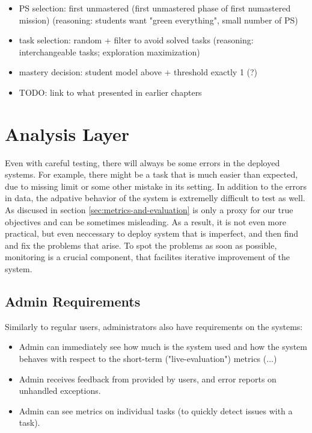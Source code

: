 \begin{itemize}
\item PS selection: first unmastered
  (first unmastered phase of first numastered mission)
  (reasoning: students want "green everything", small number of PS)
\item task selection: random + filter to avoid solved tasks
  (reasoning: interchangeable tasks; exploration maximization)
\item mastery decision: student model above + threshold exactly 1 (?)
\item TODO: link to what presented in earlier chapters
\end{itemize}





\section{Analysis Layer}
\label{sec:robomission.analysis-layer}

Even with careful testing, there will always be some errors in the deployed systems.
For example, there might be a task that is much easier than expected,
due to missing limit or some other mistake in its setting.
In addition to the errors in data,  %
the adpative behavior of the system is extremelly difficult to test as well.
As discused in section \ref{sec:metrics-and-evaluation} is only a proxy for our true objectives
and can be sometimes misleading.
As a result, it is not even more practical, but even neccessary to deploy system
that is imperfect, and then find and fix the problems that arise.
To spot the problems as soon as possible,
monitoring is a crucial component,
that facilites iterative improvement of the system.

\subsection{Admin Requirements}
\label{sec:admin-requirements}

Similarly to regular users, administrators also have requirements on the systems:

\begin{itemize}
\item Admin can immediately see how much is the system used and how the system behaves with respect to the short-term ("live-evaluation") metrics (...)
\item Admin receives feedback from provided by users, and error reports on unhandled exceptions.
\item Admin can see metrics on individual tasks (to quickly detect issues with a task).
\end{itemize}


